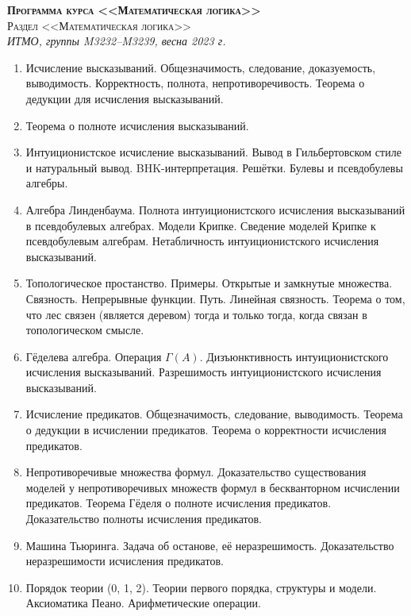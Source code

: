 \documentclass[11pt,a4paper,oneside]{scrartcl}
\begin{document}
\pagestyle{empty}

\begin{center}
{\large\scshape\bfseries Программа курса <<Математическая логика>>}\\
{\large\scshape Раздел <<Математическая логика>>}\\
\itshape ИТМО, группы M3232--M3239, весна 2023 г.
\end{center}


\begin{enumerate}
\item Исчисление высказываний. Общезначимость, следование, доказуемость, выводимость. Корректность, полнота, непротиворечивость.
Теорема о дедукции для исчисления высказываний. 
\item Теорема о полноте исчисления высказываний.
\item Интуиционистское исчисление высказываний. Вывод в Гильбертовском стиле и натуральный вывод.
BHK-интерпретация. Решётки. Булевы и псевдобулевы алгебры.
\item Алгебра Линденбаума. Полнота интуиционистского исчисления высказываний в псевдобулевых алгебрах.
Модели Крипке. Сведение моделей Крипке к псевдобулевым алгебрам. Нетабличность 
интуиционистского исчисления высказываний.
\item Топологическое простанство. Примеры. Открытые и замкнутые множества. Связность. Непрерывные функции. Путь.
Линейная связность. Теорема о том, что лес связен (является деревом) тогда и только тогда, когда связан в топологическом смысле.
\item Гёделева алгебра. Операция $\Gamma(A)$. Дизъюнктивность интуиционистского исчисления высказываний. Разрешимость 
интуиционистского исчисления высказываний.
\item Исчисление предикатов. Общезначимость, следование, выводимость. Теорема о дедукции в исчислении предикатов.
Теорема о корректности исчисления предикатов.
\item Непротиворечивые множества формул. Доказательство существования моделей у непротиворечивых множеств формул 
в бескванторном исчислении предикатов.
Теорема Гёделя о полноте исчисления предикатов. Доказательство полноты исчисления предикатов.
\item Машина Тьюринга. Задача об останове, её неразрешимость. Доказательство неразрешимости исчисления предикатов.
\item Порядок теории (0, 1, 2). Теории первого порядка, структуры и модели. Аксиоматика Пеано. Арифметические операции. 

\end{enumerate}
\end{document}
